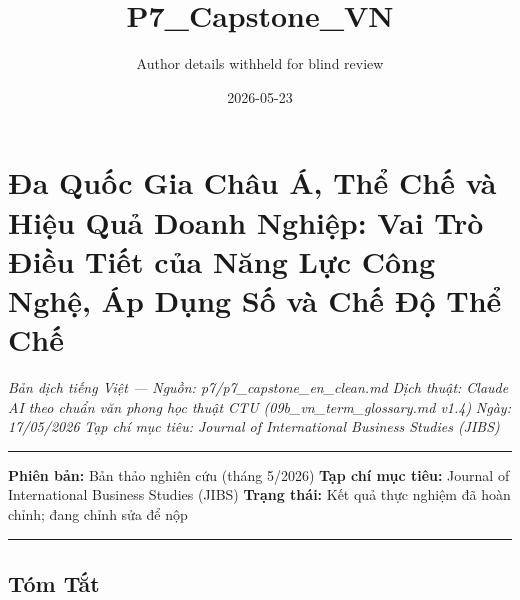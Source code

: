 \documentclass[12pt,a4paper]{article}
\title{P7\_Capstone\_VN}
\author{Author details withheld for blind review}
\date{2026-05-23}
\begin{document}
\maketitle

\hypertarget{ux111a-quux1ed1c-gia-chuxe2u-uxe1-thux1ec3-chux1ebf-vuxe0-hiux1ec7u-quux1ea3-doanh-nghiux1ec7p-vai-truxf2-ux111iux1ec1u-tiux1ebft-cux1ee7a-nux103ng-lux1ef1c-cuxf4ng-nghux1ec7-uxe1p-dux1ee5ng-sux1ed1-vuxe0-chux1ebf-ux111ux1ed9-thux1ec3-chux1ebf}{%
\section{Đa Quốc Gia Châu Á, Thể Chế và Hiệu Quả Doanh Nghiệp: Vai Trò
Điều Tiết của Năng Lực Công Nghệ, Áp Dụng Số và Chế Độ Thể
Chế}\label{ux111a-quux1ed1c-gia-chuxe2u-uxe1-thux1ec3-chux1ebf-vuxe0-hiux1ec7u-quux1ea3-doanh-nghiux1ec7p-vai-truxf2-ux111iux1ec1u-tiux1ebft-cux1ee7a-nux103ng-lux1ef1c-cuxf4ng-nghux1ec7-uxe1p-dux1ee5ng-sux1ed1-vuxe0-chux1ebf-ux111ux1ed9-thux1ec3-chux1ebf}}

\emph{Bản dịch tiếng Việt --- Nguồn: p7/p7\_capstone\_en\_clean.md}
\emph{Dịch thuật: Claude AI theo chuẩn văn phong học thuật CTU
(09b\_vn\_term\_glossary.md v1.4)} \emph{Ngày: 17/05/2026} \emph{Tạp chí
mục tiêu: Journal of International Business Studies (JIBS)}

\begin{center}\rule{0.5\linewidth}{0.5pt}\end{center}

\textbf{Phiên bản:} Bản thảo nghiên cứu (tháng 5/2026) \textbf{Tạp chí
mục tiêu:} Journal of International Business Studies (JIBS)
\textbf{Trạng thái:} Kết quả thực nghiệm đã hoàn chỉnh; đang chỉnh sửa
để nộp

\begin{center}\rule{0.5\linewidth}{0.5pt}\end{center}

\hypertarget{tuxf3m-tux1eaft}{%
\subsection{Tóm Tắt}\label{tuxf3m-tux1eaft}}
\end{document}
